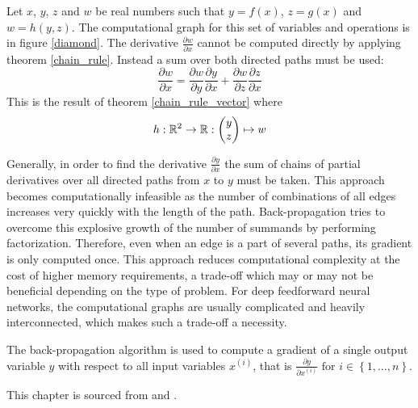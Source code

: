 \begin{example}
	Let \( x \), \( y \), \( z \) and \( w \) be real numbers such that \( y = f \left( x \right) \), \( z = g \left( x \right) \) and \( w = h \left( y, z \right) \). The computational graph for this set of variables and operations is in figure \ref{diamond}. The derivative \( \frac{\partial w}{\partial x} \) cannot be computed directly by applying theorem \ref{chain_rule}. Instead a sum over both directed paths must be used:
	\[ \frac{\partial w}{\partial x} = \frac{\partial w}{\partial y} \frac{\partial y}{\partial x} + \frac{\partial w}{\partial z} \frac{\partial z}{\partial x} \]
	This is the result of theorem \ref{chain_rule_vector} where 
	\[ h : \mathbb R^2 \to \mathbb R : 
	\begin{pmatrix}
		y \\
		z
	\end{pmatrix} \mapsto w \]

Generally, in order to find the derivative \( \frac{\partial y}{\partial x} \) the sum of chains of partial derivatives over all directed paths from \( x \) to \( y \) must be taken. This approach becomes computationally infeasible as the number of combinations of all edges increases very quickly with the length of the path. Back-propagation tries to overcome this explosive growth of the number of summands by performing factorization. Therefore, even when an edge is a part of several paths, its gradient is only computed once. This approach reduces computational complexity at the cost of higher memory requirements, a trade-off which may or may not be beneficial depending on the type of problem. For deep feedforward neural networks, the computational graphs are usually complicated and heavily interconnected, which makes such a trade-off a necessity.

The back-propagation algorithm is used to compute a gradient of a single output variable \( y \) with respect to all input variables \( x^{(i)} \), that is \( \frac{\partial y}{\partial x^{(i)}} \text{ for } i \in \left\{ 1, \dots, n \right\} \).

This chapter is sourced from \cite{goodfellow_deep_2016} and \cite{olah_calculus_2015}.
\end{example}
